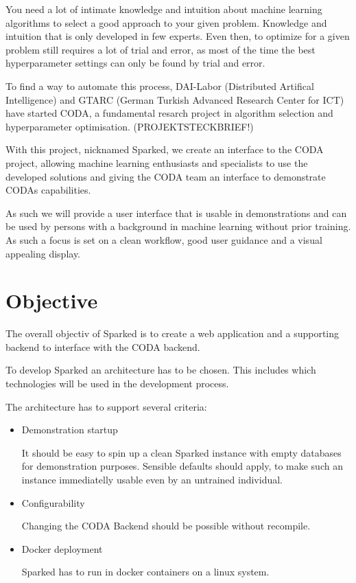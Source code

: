 \documentclass[12pt,a4paper,titlepage,oneside,BCOR1cm]{scrreprt}
\begin{document}
You need a lot of intimate knowledge and intuition about machine learning algorithms to select a good approach to your given problem. Knowledge and intuition that is only developed in few experts. Even then, to optimize for a given problem still requires a lot of trial and error, as most of the time the best hyperparameter settings can only be found by trial and error.

To find a way to automate this process, DAI-Labor (Distributed Artifical Intelligence) and GTARC (German Turkish Advanced Research Center for ICT) have started CODA, a fundamental resarch project in algorithm selection and hyperparameter optimisation. (PROJEKTSTECKBRIEF!)

With this project, nicknamed Sparked, we create an interface to the CODA project, allowing machine learning enthusiasts and specialists to use the developed solutions and giving the CODA team an interface to demonstrate CODAs capabilities.

As such we will provide a user interface that is usable in demonstrations and can be used by persons with a background in machine learning without prior training. As such a focus is set on a clean workflow, good user guidance and a visual appealing display.

\chapter{Objective}
The overall objectiv of Sparked is to create a web application and a supporting backend to interface with the CODA backend.

To develop Sparked an architecture has to be chosen. This includes which technologies will be used in the development process. 

The architecture has to support several criteria:
\begin{itemize}
  \item Demonstration startup
  
  It should be easy to spin up a clean Sparked instance with empty databases for demonstration purposes. Sensible defaults should apply, to make such an instance immediatelly usable even by an untrained individual.

  \item Configurability

  Changing the CODA Backend should be possible without recompile.

  \item Docker deployment

  Sparked has to run in docker containers on a linux system.

\end{itemize}
\end{document}

